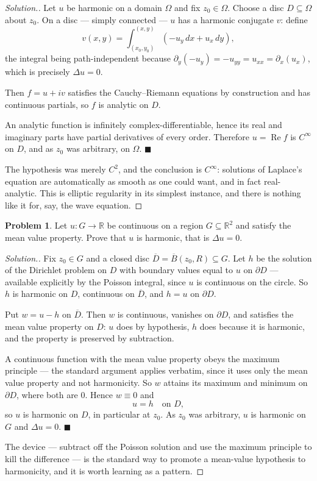 \documentclass[11pt,a4paper]{article}
\theoremstyle{definition}
\newtheorem{problemx}{Problem}[section]
\newenvironment{problem}{\begin{problemx}}{\end{problemx}}
\newenvironment{solution}
  {\renewcommand{\qedsymbol}{}\begin{proof}[\textit{Solution}.]}
  {\end{proof}}
\begin{document}
\begin{solution}
Let $u$ be harmonic on a domain $\Omega$ and fix $z_0 \in \Omega$. Choose a disc
$D \subseteq \Omega$ about $z_0$. On a disc --- simply connected --- $u$ has a
harmonic conjugate $v$: define
$$v(x,y) = \int_{(x_0,y_0)}^{(x,y)} \left(-u_y\,dx + u_x\,dy\right),$$
the integral being path-independent because
$\partial_y(-u_y) = -u_{yy} = u_{xx} = \partial_x(u_x)$, which is precisely
$\Delta u = 0$.

Then $f = u + iv$ satisfies the Cauchy--Riemann equations by construction and has
continuous partials, so $f$ is analytic on $D$.

An analytic function is infinitely complex-differentiable, hence its real and
imaginary parts have partial derivatives of every order. Therefore
$u = \operatorname{Re}f$ is $C^{\infty}$ on $D$, and as $z_0$ was arbitrary, on
$\Omega$. $\blacksquare$

The hypothesis was merely $C^{2}$, and the conclusion is $C^{\infty}$: solutions of
Laplace's equation are automatically as smooth as one could want, and in fact
real-analytic. This is elliptic regularity in its simplest instance, and there is
nothing like it for, say, the wave equation.
\end{solution}


\begin{problem}
Let $u : G \rightarrow \mathbb{R}$ be continuous on a region
$G \subseteq \mathbb{R}^{2}$ and satisfy the mean value property. Prove that $u$
is harmonic, that is $\Delta u = 0$.
\end{problem}

\begin{solution}
Fix $z_0 \in G$ and a closed disc $\overline{D} = \overline{B}(z_0,R) \subseteq G$.
Let $h$ be the solution of the Dirichlet problem on $D$ with boundary values equal
to $u$ on $\partial D$ --- available explicitly by the Poisson integral, since $u$
is continuous on the circle. So $h$ is harmonic on $D$, continuous on
$\overline{D}$, and $h = u$ on $\partial D$.

Put $w = u - h$ on $\overline{D}$. Then $w$ is continuous, vanishes on
$\partial D$, and satisfies the mean value property on $D$: $u$ does by hypothesis,
$h$ does because it is harmonic, and the property is preserved by subtraction.

A continuous function with the mean value property obeys the maximum principle ---
the standard argument applies verbatim, since it uses only the mean value property
and not harmonicity. So $w$ attains its maximum and minimum on $\partial D$, where
both are $0$. Hence $w \equiv 0$ and
$$u = h \quad\text{on } D,$$
so $u$ is harmonic on $D$, in particular at $z_0$. As $z_0$ was arbitrary, $u$ is
harmonic on $G$ and $\Delta u = 0$. $\blacksquare$

The device --- subtract off the Poisson solution and use the maximum principle to
kill the difference --- is the standard way to promote a mean-value hypothesis to
harmonicity, and it is worth learning as a pattern.
\end{solution}
\end{document}
